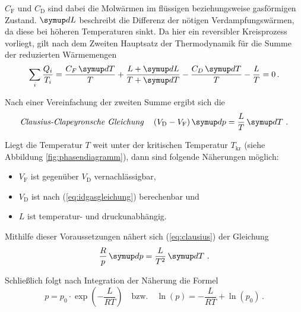 $C_\text{F}$ und $C_\text{D}$ sind dabei die Molwärmen im flüssigen beziehungsweise gasförmigen Zustand.
$\dif{L}$ beschreibt die Differenz der nötigen Verdampfungswärmen, da diese bei höheren Temperaturen sinkt.
Da hier ein reversibler Kreisprozess vorliegt, gilt nach dem Zweiten Hauptsatz der Thermodynamik für 
die Summe der reduzierten Wärmemengen
\begin{equation}
    \sum_{i} \frac{Q_{i}}{T_{i}} = 
    \frac {C_{F}\dif{T}} {T} + \frac {L+\dif{L}} {T+\dif{T}} - \frac {C_{D}\dif{T}} {T}-\frac{L}{T} =
    0 \, .
\end{equation}

Nach einer Vereinfachung der zweiten Summe ergibt sich die 
\begin{equation}
    \text{\textit{Clausius-Clapeyronsche Gleichung}} \quad \left(V_{\text{D}}-V_{\text{F}}\right) \dif{p} = \frac{L}{T} \dif{T} \, . 
    \label{eq:clausius}
\end{equation}

Liegt die Temperatur $T$ weit unter der kritischen Temperatur $T_\text{kr}$ (siehe Abbildung \ref{fig:phasendiagramm}),
dann sind folgende Näherungen möglich:
\begin{itemize}
    \item $V_\text{F}$ ist gegenüber $V_\text{D}$ vernachlässigbar,
    \item $V_\text{D}$ ist nach (\ref{eq:idgasgleichung}) berechenbar und
    \item $L$ ist temperatur- und druckunabhängig.
\end{itemize}

Mithilfe dieser Voraussetzungen nähert sich (\ref{eq:clausius}) der Gleichung
\begin{equation}
    \frac{R}{p} \dif{p} = \frac{L}{T^2} \dif{T} \, . 
    \label{eq:approxclausius}
\end{equation}

Schließlich folgt nach Integration der Näherung die Formel
\begin{equation}
    p = p_{0} \cdot \exp \left(-\frac{L}{R T}\right) \quad \text{bzw.} \quad \ln(p)= -\frac{L}{R T} + \ln(p_{0}) \, .
    \label{eq:damppfdruck}
\end{equation}
